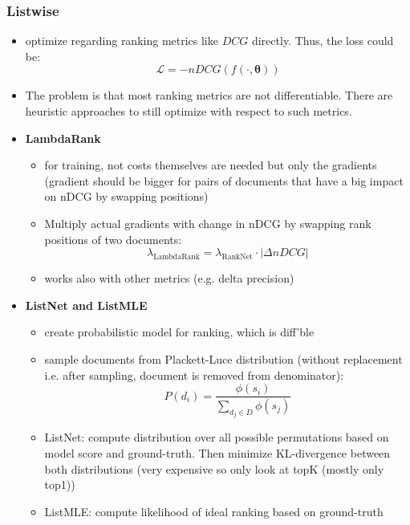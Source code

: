 \subsubsection{Listwise}
\begin{itemize}
	\item optimize regarding ranking metrics like $DCG$ directly. Thus, the loss could be:
	$$\mathcal{L} = -nDCG(f(\cdot,\bm{\theta}))$$
	\item The problem is that most ranking metrics are not differentiable. There are heuristic approaches to still optimize with respect to such metrics.
	\item \textbf{LambdaRank}
	\begin{itemize}
		\item for training, not costs themselves are needed but only the gradients (gradient should be bigger for pairs of documents that have a big impact on nDCG by swapping positions)
		\item Multiply actual gradients with change in nDCG by swapping rank positions of two documents:
		$$\lambda_{\mathrm{LambdaRank}} = \lambda_{\mathrm{RankNet}} \cdot |\Delta nDCG|$$
		\item works also with other metrics (e.g. delta precision)
	\end{itemize}
	\item \textbf{ListNet and ListMLE}
	\begin{itemize}
		\item create probabilistic model for ranking, which is diff'ble
		\item sample documents from Plackett-Luce distribution (without replacement i.e. after sampling, document is removed from denominator):
		$$P(d_i) = \dfrac{\phi(s_i)}{\sum_{d_j \in D}\phi(s_j)}$$
		\item ListNet: compute distribution over all possible permutations based on model score and ground-truth. Then minimize KL-divergence between both distributions (very expensive so only look at topK (mostly only top1))
		\item ListMLE: compute likelihood of ideal ranking based on ground-truth
	\end{itemize}
\end{itemize}
